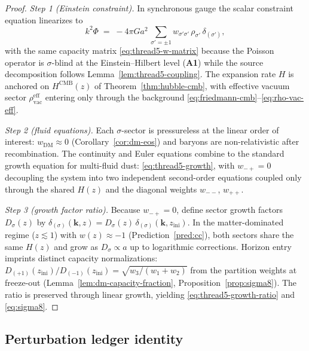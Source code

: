 \begin{proof}
\emph{Step 1 (Einstein constraint).}
In synchronous gauge the scalar constraint equation linearizes to
\begin{equation}\label{eq:thread5-constraint}
  k^2\Phi
  \;=\;
  -4\pi G a^2\,
  \sum_{\sigma'=\pm1}
  w_{\sigma'\sigma'}\,\rho_{\sigma'}\,\delta_{(\sigma')},
\end{equation}
with the same capacity matrix \eqref{eq:thread5-w-matrix} because the Poisson
operator is $\sigma$-blind at the Einstein--Hilbert level (\textbf{A1}) while
the source decomposition follows Lemma~\ref{lem:thread5-coupling}. The
expansion rate $H$ is anchored on $H^{\mathrm{CMB}}(z)$ of
Theorem~\ref{thm:hubble-cmb}, with effective vacuum sector
$\rho_{\mathrm{vac}}^{\mathrm{eff}}$ entering only through the background
\eqref{eq:friedmann-cmb}--\eqref{eq:rho-vac-eff}.

\emph{Step 2 (fluid equations).}
Each $\sigma$-sector is pressureless at the linear order of interest:
$w_{\mathrm{DM}}\approx 0$ (Corollary~\ref{cor:dm-eos}) and baryons are
non-relativistic after recombination. The continuity and Euler equations
combine to the standard growth equation for multi-fluid dust:
\eqref{eq:thread5-growth}, with $w_{-+}=0$ decoupling the system into two
independent second-order equations coupled only through the shared $H(z)$ and
the diagonal weights $w_{--}$, $w_{++}$.

\emph{Step 3 (growth factor ratio).}
Because $w_{-+}=0$, define sector growth factors $D_\sigma(z)$ by
$\delta_{(\sigma)}(\mathbf{k},z)=D_\sigma(z)\,\delta_{(\sigma)}(\mathbf{k},z_{\mathrm{ini}})$.
In the matter-dominated regime ($z\lesssim 1$) with
$w(z)\approx -1$ (Prediction~\ref{pred:cc}), both sectors share the same
$H(z)$ and grow as $D_\sigma\propto a$ up to logarithmic corrections. Horizon
entry imprints distinct capacity normalizations:
$D_{(+1)}(z_{\mathrm{ini}})/D_{(-1)}(z_{\mathrm{ini}})=\sqrt{w_3/(w_1+w_2)}$
from the partition weights at freeze-out
(Lemma~\ref{lem:dm-capacity-fraction}, Proposition~\ref{prop:sigma8}). The
ratio is preserved through linear growth, yielding
\eqref{eq:thread5-growth-ratio} and \eqref{eq:sigma8}.
\end{proof}

\subsection{Perturbation ledger identity}
\label{sec:wave2-thread5:ledger}

